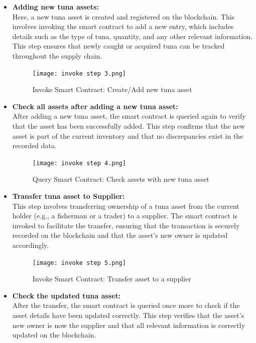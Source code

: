 	\begin{itemize}
	\item \textbf{Adding new tuna assets:}\\
	Here, a new tuna asset is created and registered on the blockchain. This involves invoking the smart contract to add a new entry, which includes details such as the type of tuna, quantity, and any other relevant information. This step ensures that newly caught or acquired tuna can be tracked throughout the supply chain.
	
	\begin{figure}[H]
		\centering
		\texttt{[image: invoke step 3.png]}
		\caption{Invoke Smart Contract: Create/Add new tuna asset}
		\label{fig: third step}
	\end{figure}
	
	\item \textbf{Check all assets after adding a new tuna asset:}\\
	After adding a new tuna asset, the smart contract is queried again to verify that the asset has been successfully added. This step confirms that the new asset is part of the current inventory and that no discrepancies exist in the recorded data.
	
	\begin{figure}[H]
		\centering
		\texttt{[image: invoke step 4.png]}
		\caption{Query Smart Contract: Check assets with new tuna asset}
		\label{fig: fourth step}
	\end{figure}
	
	\item \textbf{Transfer tuna asset to Supplier:}\\
	This step involves transferring ownership of a tuna asset from the current holder (e.g., a fisherman or a trader) to a supplier. The smart contract is invoked to facilitate the transfer, ensuring that the transaction is securely recorded on the blockchain and that the asset’s new owner is updated accordingly.
	
	\begin{figure}[H]
		\centering
		\texttt{[image: invoke step 5.png]}
		\caption{Invoke Smart Contract: Transfer asset to a supplier}
		\label{fig: fifth step}
	\end{figure}
	
	\item \textbf{Check the updated tuna asset:}\\
	After the transfer, the smart contract is queried once more to check if the asset details have been updated correctly. This step verifies that the asset’s new owner is now the supplier and that all relevant information is correctly updated on the blockchain.
	

\end{itemize}

